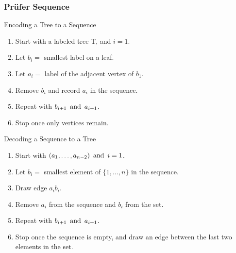 \subsubsection*{Prüfer Sequence}
Encoding a Tree to a Sequence
\begin{enumerate}
    \item Start with a labeled tree T, and $i = 1$.
    \item Let $b_i =$ smallest label on a leaf.
    \item Let $a_i =$ label of the adjacent vertex of $b_1$.
    \item Remove $b_i$ and record $a_i$ in the sequence.
    \item Repeat with $b_{i+1} \operatorname{~\text{and}~} a_{i+1}$.
    \item Stop once only vertices remain.
\end{enumerate}
Decoding a Sequence to a Tree
\begin{enumerate}
    \item Start with $(a_1, \ldots, a_{n-2}) \operatorname{~\text{and}~} i = 1$.
    \item Let $b_i =$ smallest element of $\{1,\ldots,n\}$  in the sequence.
    \item Draw edge $a_ib_i$.
    \item Remove $a_i$ from the sequence and $b_i$ from the set.
    \item Repeat with $b_{i+1} \operatorname{~\text{and}~} a_{i+1}$.
    \item Stop once the sequence is empty, and draw an edge between the last two elements in the set.
\end{enumerate}